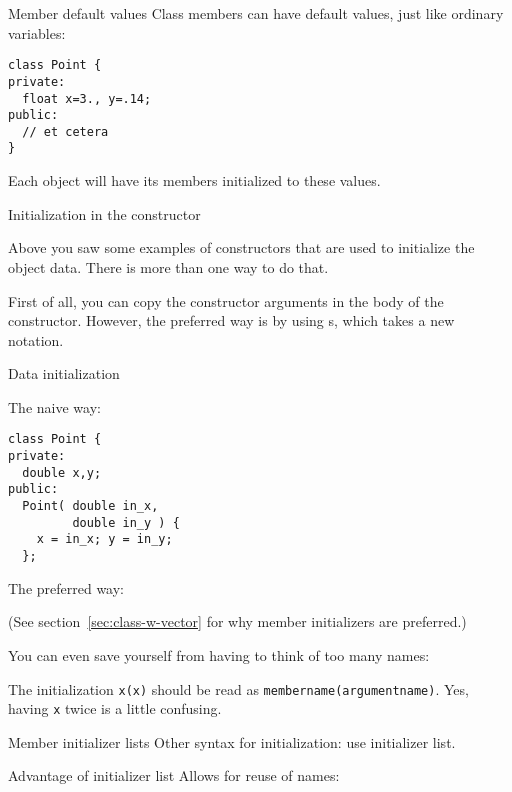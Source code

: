 \begin{block}{Member default values}
  \label{sl:class-defval}
  Class members can have default values, just like ordinary variables:
\begin{lstlisting}
class Point {
private:
  float x=3., y=.14;
public:
  // et cetera
}
\end{lstlisting}
  Each object will have its members initialized to these values.
\end{block}

 {Initialization in the constructor}


Above you saw some examples of constructors that are used
to initialize the object data.
There is more than one way to do that.

First of all, you can copy the constructor arguments
in the body of the constructor.
However, the preferred way is by using s,
which takes a new notation.

\begin{block}{Data initialization}
  \label{sl:contructor-init-2}
\begin{multicols}{2}
The naive way:
\begin{lstlisting}
class Point {
private:
  double x,y;
public:
  Point( double in_x,
         double in_y ) {
    x = in_x; y = in_y;
  };
\end{lstlisting}
\columnbreak
The preferred way:
\end{multicols}
\end{block}

(See section~\ref{sec:class-w-vector} for why member initializers are preferred.)

You can even save yourself from having to think of too many names:


The initialization \lstinline{x(x)} should be read as
\lstinline{membername(argumentname)}.
Yes, having \lstinline{x} twice is a little confusing.

\begin{slide}{Member initializer lists}
  \label{sl:class-init}
  Other syntax for initialization:\slidenewline
  use initializer list.
\end{slide}

\begin{slide}{Advantage of initializer list}
  \label{sl:class-init-why}
  Allows for reuse of names:
\end{slide}

